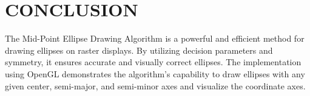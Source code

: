\documentclass{article}
\begin{document}
\section*{CONCLUSION}
The Mid-Point Ellipse Drawing Algorithm is a powerful and efficient method for drawing ellipses on raster displays. By utilizing decision parameters and symmetry, it ensures accurate and visually correct ellipses. The implementation using OpenGL demonstrates the algorithm's capability to draw ellipses with any given center, semi-major, and semi-minor axes and visualize the coordinate axes.
\end{document}
